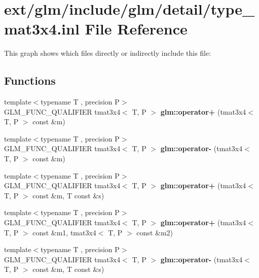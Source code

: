 \hypertarget{type__mat3x4_8inl}{\section{ext/glm/include/glm/detail/type\-\_\-mat3x4.inl File Reference}
\label{type__mat3x4_8inl}
}
This graph shows which files directly or indirectly include this file\-:
\subsection*{Functions}
\begin{DoxyCompactItemize}
\item 
\hypertarget{namespaceglm_a22ac402749dde369e329512ca3b12bc7}{{\footnotesize template$<$typename T , precision P$>$ }\\G\-L\-M\-\_\-\-F\-U\-N\-C\-\_\-\-Q\-U\-A\-L\-I\-F\-I\-E\-R tmat3x4$<$ T, P $>$ {\bfseries glm\-::operator+} (tmat3x4$<$ T, P $>$ const \&m)}\label{namespaceglm_a22ac402749dde369e329512ca3b12bc7}

\item 
\hypertarget{namespaceglm_a1322505211ba57518d78489694f2a16c}{{\footnotesize template$<$typename T , precision P$>$ }\\G\-L\-M\-\_\-\-F\-U\-N\-C\-\_\-\-Q\-U\-A\-L\-I\-F\-I\-E\-R tmat3x4$<$ T, P $>$ {\bfseries glm\-::operator-\/} (tmat3x4$<$ T, P $>$ const \&m)}\label{namespaceglm_a1322505211ba57518d78489694f2a16c}

\item 
\hypertarget{namespaceglm_a6922ab94873919fd84bc2c3bdfa07161}{{\footnotesize template$<$typename T , precision P$>$ }\\G\-L\-M\-\_\-\-F\-U\-N\-C\-\_\-\-Q\-U\-A\-L\-I\-F\-I\-E\-R tmat3x4$<$ T, P $>$ {\bfseries glm\-::operator+} (tmat3x4$<$ T, P $>$ const \&m, T const \&s)}\label{namespaceglm_a6922ab94873919fd84bc2c3bdfa07161}

\item 
\hypertarget{namespaceglm_a561a98c191b0a0dd371b7a076cda269d}{{\footnotesize template$<$typename T , precision P$>$ }\\G\-L\-M\-\_\-\-F\-U\-N\-C\-\_\-\-Q\-U\-A\-L\-I\-F\-I\-E\-R tmat3x4$<$ T, P $>$ {\bfseries glm\-::operator+} (tmat3x4$<$ T, P $>$ const \&m1, tmat3x4$<$ T, P $>$ const \&m2)}\label{namespaceglm_a561a98c191b0a0dd371b7a076cda269d}

\item 
\hypertarget{namespaceglm_acdaa9aa6b7961c7473df41fcc89eedeb}{{\footnotesize template$<$typename T , precision P$>$ }\\G\-L\-M\-\_\-\-F\-U\-N\-C\-\_\-\-Q\-U\-A\-L\-I\-F\-I\-E\-R tmat3x4$<$ T, P $>$ {\bfseries glm\-::operator-\/} (tmat3x4$<$ T, P $>$ const \&m, T const \&s)}\label{namespaceglm_acdaa9aa6b7961c7473df41fcc89eedeb}


\end{DoxyCompactItemize}
